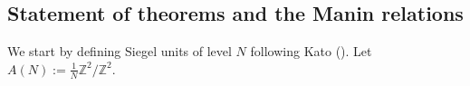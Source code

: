 \documentclass[12pt,amstex,amssymb]{article}
\theoremstyle{plain}
\theoremstyle{definition}
\def\fH{{\frak H}}
\def\Z{{\mathbb Z}}
\def\C{{\mathbb C}}
\def\Q{{\mathbb Q}}
\newcommand{\Dist}{\operatorname{Dist}}
\begin{document}









\subsection{Statement of theorems and the Manin relations}




We start by defining Siegel units of level $N$ following Kato (\cite[subsection 1.9]{Kat}). Let $A(N):=\frac{1}{N}\Z^2/\Z^2$.
\end{document}
